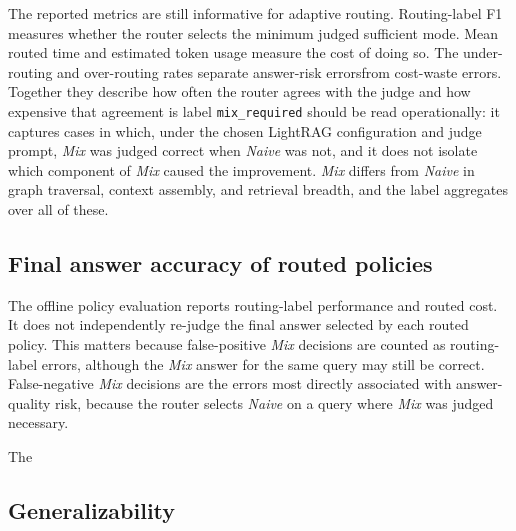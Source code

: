 \documentclass[english, bibtex]{kththesis}               %
\numberwithin{listing}{chapter}
\providecommand{\DIFaddtex}[1]{{\protect\color{blue} \sf #1}} %
\providecommand{\DIFdeltex}[1]{{\protect\color{red} \scriptsize #1}} %
\providecommand{\DIFaddbegin}{} %
\providecommand{\DIFaddend}{} %
\providecommand{\DIFdelbegin}{} %
\providecommand{\DIFdelend}{} %
\providecommand{\DIFadd}[1]{\texorpdfstring{\DIFaddtex{#1}}{#1}} %
\providecommand{\DIFdel}[1]{\texorpdfstring{\DIFdeltex{#1}}{}} %
\begin{document}
The \DIFdelbegin \DIFdel{reported metrics are still informative for adaptive routing. Routing-label F1 measures whether the router selects the minimum judged sufficient mode. Mean routed time and estimated token usage measure the cost of doing so.
The under-routing and over-routing rates separate answer-risk errorsfrom cost-waste errors. Together they describe how often the router agrees with the judge and how expensive that agreement is}\DIFdelend \DIFaddbegin \DIFadd{label \texttt{mix\_required} should be read operationally: it captures cases in which, under the chosen LightRAG configuration and judge prompt, \emph{Mix} was judged correct when \emph{Naive} was not, and it does not isolate which component of \emph{Mix} caused the improvement. \emph{Mix} differs from \emph{Naive} in graph traversal, context assembly, and retrieval breadth, and the label aggregates over all of these.
}

\subsection{Final answer accuracy of routed policies}
\label{sec:limitFinalAnswerAccuracy}

\DIFadd{The offline policy evaluation reports routing-label performance and routed cost. It does not independently re-judge the final answer selected by each routed policy. This matters because false-positive \emph{Mix} decisions are counted as routing-label errors, although the \emph{Mix} answer for the same query may still be correct. False-negative \emph{Mix} decisions are the errors most directly associated with answer-quality risk, because the router selects \emph{Naive} on a query where \emph{Mix} was judged necessary}\DIFaddend .

\DIFdelbegin \DIFdel{The }\DIFdelend \DIFaddbegin \subsection{Generalizability}
\label{sec:limitGeneralizability}
\end{document}
